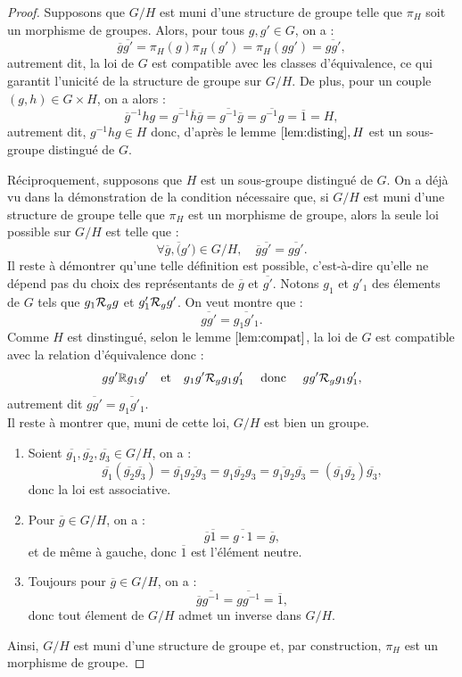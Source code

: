 \begin{proof}
Supposons que $G/H$ est muni d'une structure de groupe telle que $\pi_H$ soit un morphisme de groupes. 
Alors, pour tous $g, g' \in G$, on a :
\[ \overline{g} \overline{g'} = \pi_H(g) \pi_H(g') = \pi_H(g g') = \overline{ g g'} , \]
autrement dit, la loi de $G$ est compatible avec les classes d'équivalence, ce qui garantit l'unicité de la structure de groupe sur $G/H$.
De plus, pour un couple $(g, h) \in G \times H$, on a alors :
\[ \overline g^{-1} h g = \overline{g^{-1}} \overline{h} \overline{g} = \overline{g^{-1}} \overline{g} = 
\overline{g^{-1} g} = \overline{1} = H , \]
autrement dit, $g^{-1}hg \in H$ donc, d'après le lemme $\ref{lem:disting}, H$ est un sous-groupe distingué de $G$. \newline

Réciproquement, supposons que $H$ est un sous-groupe distingué de $G$. 
On a déjà vu dans la démonstration de la condition nécessaire que, si $G/H$ est muni d'une structure de groupe telle que 
$\pi_H$ est un morphisme de groupe, alors la seule loi possible sur $G/H$ est telle que :
\[ \forall \overline{g}, \overline(g') \in G/H, \quad \overline{g} \overline{g'} = \overline{ g g'} . \]
Il reste à démontrer qu'une telle définition est possible, c'est-à-dire qu'elle ne dépend pas du choix des représentants de 
$\overline{g}$ et $\overline{g'}$.
Notons $g_1$ et $g'_1$ des élements de $G$ tels que $g_1 \mathcal{R}_g g$ et $g'_1 \mathcal{R}_g g'$. On veut montre que :
\[ \overline{g g'} = \overline{g_1 g'_1} . \]
Comme $H$ est dinstingué, selon le lemme $\ref{lem:compat}$, la loi de $G$ est compatible avec la relation d'équivalence donc :
\[ gg' \mathbb{R} g_1 g' \quad \text{et} \quad g_1 g' \mathcal{R}_g g_1 g'_1 \quad \text{ donc } \quad gg' \mathcal{R}_g g_1 g'_1 , \]
autrement dit $\overline{gg'} = \overline{g_1 g'_1}$. \\
Il reste à montrer que, muni de cette loi, $G/H$ est bien un groupe. 
\begin{enumerate}[label=(\roman*)]
\item Soient $\overline{g_1}, \overline{g_2}, \overline{g_3} \in G/H$, on a :
\[ \overline{g_1} ( \overline{g_2} \overline{g_3} ) = \overline{g_1} \overline{g_2 g_3} = \overline{g_1 g_2 g_3}
 = \overline{g_1 g_2} \overline{g_3} = (\overline{g_1} \overline{g_2}) \overline{g_3} , \]
 donc la loi est associative. 
\item Pour $\overline{g} \in G/H$, on a :
\[ \overline{g} \overline{1} = \overline{g \cdot 1} = \overline{g} , \]
et de même à gauche, donc $\overline{1}$ est l'élément neutre.
\item Toujours pour $\overline{g} \in G/H$, on a :
\[ \overline{g} \overline{g^{-1}} = \overline{g g^{-1}} = \overline{1}, \]
donc tout élement de $G/H$ admet un inverse dans $G/H$.   
\end{enumerate}
Ainsi, $G/H$ est muni d'une structure de groupe et, par construction, $\pi_H$ est un morphisme de groupe.
\end{proof}

